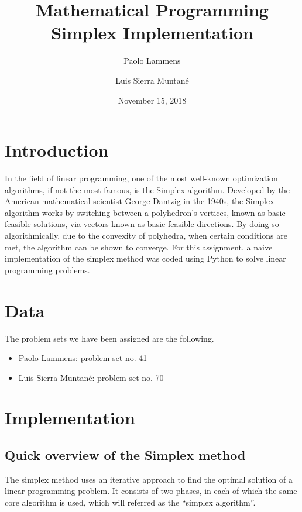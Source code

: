 \documentclass[a4paper]{article}
\title{Mathematical Programming \\ \Large Simplex Implementation}
\author{Paolo Lammens}
\author{Luis Sierra Muntané}
\affil{GM -- FME -- UPC}
\date{November 15, 2018}
\begin{document}

\maketitle
\thispagestyle{empty}

\pagebreak

\tableofcontents
\thispagestyle{empty}

\newpage

\section{Introduction}

In the field of linear programming, one of the most well-known optimization algorithms, if not the most famous, is the Simplex algorithm. Developed by the American mathematical scientist George Dantzig in the 1940s, the Simplex algorithm works by switching between a polyhedron's vertices, known as basic feasible solutions, via vectors known as basic feasible directions. By doing so algorithmically, due to the convexity of polyhedra, when certain conditions are met, the algorithm can be shown to converge.
For this assignment, a naive implementation of the simplex method was coded using Python to solve linear programming problems.

\section{Data}

The problem sets we have been assigned are the following.
\begin{itemize}
    \item Paolo Lammens: problem set no. 41
    \item Luis Sierra Muntané: problem set no. 70
\end{itemize}

\section{Implementation}
\subsection{Quick overview of the Simplex method}
The simplex method uses an iterative approach to find the optimal solution of a linear programming problem. It consists of two phases, in each of which the same core algorithm is used, which will referred as the ``simplex algorithm''.
\end{document}
